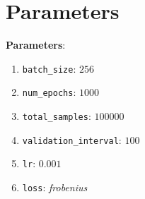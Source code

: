 \documentclass{article}
\begin{document}
\section{Parameters}
\textbf{Parameters}:
{
\begin{enumerate}
    \item \texttt{batch\_size}: $256$
    \item \texttt{num\_epochs}: $1000$
    \item \texttt{total\_samples}: $100000$
    \item \texttt{validation\_interval}: $100$
    \item \texttt{lr}: $0.001$
    \item \texttt{loss}: \textit{frobenius}
\end{enumerate}
}
\pagebreak



\end{document}
